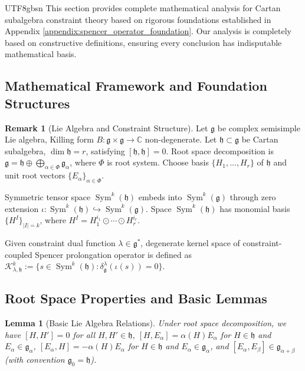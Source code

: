 \documentclass[a4paper,12pt]{extarticle}
\newtheorem{lemma}[theorem]{Lemma}
\theoremstyle{definition}
\newtheorem{remark}{Remark}[section]
\begin{document}
\begin{CJK}{UTF8}{gbsn}
This section provides complete mathematical analysis for Cartan subalgebra constraint theory based on rigorous foundations established in Appendix \ref{appendix:spencer_operator_foundation}. Our analysis is completely based on constructive definitions, ensuring every conclusion has indisputable mathematical basis.

\subsection{Mathematical Framework and Foundation Structures}
\label{subsec:mathematical_framework_foundations}

\begin{remark}[Lie Algebra and Constraint Structure]
\label{setup:lie_algebra_constraint_structure}
Let $\mathfrak{g}$ be complex semisimple Lie algebra, Killing form $B: \mathfrak{g} \times \mathfrak{g} \to \mathbb{C}$ non-degenerate. Let $\mathfrak{h} \subset \mathfrak{g}$ be Cartan subalgebra, $\dim \mathfrak{h} = r$, satisfying $[\mathfrak{h}, \mathfrak{h}] = 0$. Root space decomposition is $\mathfrak{g} = \mathfrak{h} \oplus \bigoplus_{\alpha \in \Phi} \mathfrak{g}_\alpha$, where $\Phi$ is root system. Choose basis $\{H_1, \ldots, H_r\}$ of $\mathfrak{h}$ and unit root vectors $\{E_\alpha\}_{\alpha \in \Phi}$.

Symmetric tensor space $\operatorname{Sym}^k(\mathfrak{h})$ embeds into $\operatorname{Sym}^k(\mathfrak{g})$ through zero extension $\iota: \operatorname{Sym}^k(\mathfrak{h}) \hookrightarrow \operatorname{Sym}^k(\mathfrak{g})$. Space $\operatorname{Sym}^k(\mathfrak{h})$ has monomial basis $\{H^I\}_{|I|=k}$, where $H^I = H_1^{i_1} \odot \cdots \odot H_r^{i_r}$.

Given constraint dual function $\lambda \in \mathfrak{g}^*$, degenerate kernel space of constraint-coupled Spencer prolongation operator is defined as $\mathcal{K}^k_{\lambda,\mathfrak{h}} := \{s \in \operatorname{Sym}^k(\mathfrak{h}) : \delta^\lambda_\mathfrak{g}(\iota(s)) = 0\}$.
\end{remark}

\subsection{Root Space Properties and Basic Lemmas}
\label{subsec:root_space_properties}

\begin{lemma}[Basic Lie Algebra Relations]
\label{lem:lie_algebra_basic_relations}
Under root space decomposition, we have $[H, H'] = 0$ for all $H, H' \in \mathfrak{h}$, $[H, E_\alpha] = \alpha(H) E_\alpha$ for $H \in \mathfrak{h}$ and $E_\alpha \in \mathfrak{g}_\alpha$, $[E_\alpha, H] = -\alpha(H) E_\alpha$ for $H \in \mathfrak{h}$ and $E_\alpha \in \mathfrak{g}_\alpha$, and $[E_\alpha, E_\beta] \in \mathfrak{g}_{\alpha+\beta}$ (with convention $\mathfrak{g}_0 = \mathfrak{h}$).
\end{lemma}


\end{CJK}
\end{document}
